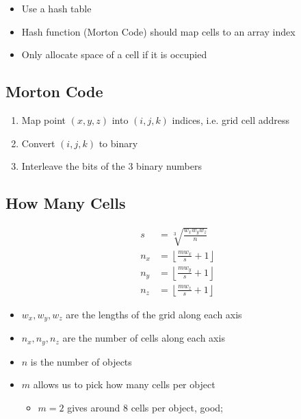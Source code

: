 \documentclass[letterpaper, 11pt]{article}
\begin{document}
    \begin{itemize}
      \item Use a hash table
      \item Hash function (Morton Code) should map cells to an array index
      \item Only allocate space of a cell if it is occupied
    \end{itemize}

    \subsection{Morton Code}

      \begin{enumerate}
        \item Map point $ \left( x, y, z \right) $ into $ \left( i, j, k \right) $
        indices, i.e. grid cell address
        \item Convert $ \left( i, j, k \right) $ to binary
        \item Interleave the bits of the 3 binary numbers
      \end{enumerate}

    \subsection{How Many Cells}

      \begin{align}
        s &= \sqrt[3]{\frac{w_{x} w_{y} w_{z}}{n}} \\
        n_{x} &= \left\lfloor \frac{mw_{x}}{s} + 1 \right\rfloor \\
        n_{y} &= \left\lfloor \frac{mw_{y}}{s} + 1 \right\rfloor \\
        n_{z} &= \left\lfloor \frac{mw_{z}}{s} + 1 \right\rfloor
      \end{align}

      \begin{itemize}
        \item $ w_{x}, w_{y}, w_{z} $ are the lengths of the grid along each
        axis
        \item $ n_{x}, n_{y}, n_{z} $ are the number of cells along each axis
        \item $ n $ is the number of objects
        \item $ m $ allows us to pick how many cells per object
        \begin{itemize}
          \item $ m = 2 $ gives around 8 cells per object, good;
        \end{itemize}
      \end{itemize}
\end{document}

